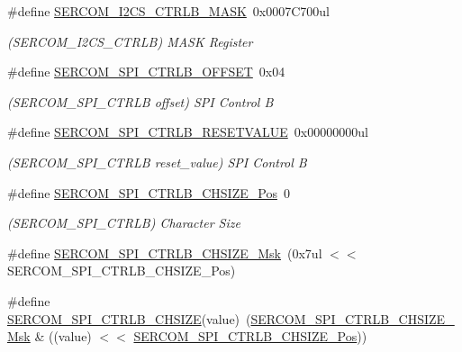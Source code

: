 \begin{DoxyCompactItemize}
\item 
\#define \mbox{\hyperlink{group___s_a_m_d21___s_e_r_c_o_m_ga0ea23da70bd50b06c4128f0c984cbf9f}{S\+E\+R\+C\+O\+M\+\_\+\+I2\+C\+S\+\_\+\+C\+T\+R\+L\+B\+\_\+\+M\+A\+SK}}~0x0007\+C700ul
\begin{DoxyCompactList}\small\item\em (S\+E\+R\+C\+O\+M\+\_\+\+I2\+C\+S\+\_\+\+C\+T\+R\+LB) M\+A\+SK Register \end{DoxyCompactList}\item 
\#define \mbox{\hyperlink{group___s_a_m_d21___s_e_r_c_o_m_ga793c49a07dc02c8237ab63e52fd0304c}{S\+E\+R\+C\+O\+M\+\_\+\+S\+P\+I\+\_\+\+C\+T\+R\+L\+B\+\_\+\+O\+F\+F\+S\+ET}}~0x04
\begin{DoxyCompactList}\small\item\em (S\+E\+R\+C\+O\+M\+\_\+\+S\+P\+I\+\_\+\+C\+T\+R\+LB offset) S\+PI Control B \end{DoxyCompactList}\item 
\#define \mbox{\hyperlink{group___s_a_m_d21___s_e_r_c_o_m_ga9a39beaf6f38afbcadd9478ef2ccad06}{S\+E\+R\+C\+O\+M\+\_\+\+S\+P\+I\+\_\+\+C\+T\+R\+L\+B\+\_\+\+R\+E\+S\+E\+T\+V\+A\+L\+UE}}~0x00000000ul
\begin{DoxyCompactList}\small\item\em (S\+E\+R\+C\+O\+M\+\_\+\+S\+P\+I\+\_\+\+C\+T\+R\+LB reset\+\_\+value) S\+PI Control B \end{DoxyCompactList}\item 
\#define \mbox{\hyperlink{group___s_a_m_d21___s_e_r_c_o_m_gafb3a3447ea56a377ecdc8eba9faa21ab}{S\+E\+R\+C\+O\+M\+\_\+\+S\+P\+I\+\_\+\+C\+T\+R\+L\+B\+\_\+\+C\+H\+S\+I\+Z\+E\+\_\+\+Pos}}~0
\begin{DoxyCompactList}\small\item\em (S\+E\+R\+C\+O\+M\+\_\+\+S\+P\+I\+\_\+\+C\+T\+R\+LB) Character Size \end{DoxyCompactList}\item 
\#define \mbox{\hyperlink{group___s_a_m_d21___s_e_r_c_o_m_ga291c7d819f4a2fbbda0e9a0541b8fdab}{S\+E\+R\+C\+O\+M\+\_\+\+S\+P\+I\+\_\+\+C\+T\+R\+L\+B\+\_\+\+C\+H\+S\+I\+Z\+E\+\_\+\+Msk}}~(0x7ul $<$$<$ S\+E\+R\+C\+O\+M\+\_\+\+S\+P\+I\+\_\+\+C\+T\+R\+L\+B\+\_\+\+C\+H\+S\+I\+Z\+E\+\_\+\+Pos)
\item 
\#define \mbox{\hyperlink{group___s_a_m_d21___s_e_r_c_o_m_ga1883bdcc91edc096fe92d494f5343b27}{S\+E\+R\+C\+O\+M\+\_\+\+S\+P\+I\+\_\+\+C\+T\+R\+L\+B\+\_\+\+C\+H\+S\+I\+ZE}}(value)~(\mbox{\hyperlink{group___s_a_m_d21___s_e_r_c_o_m_ga291c7d819f4a2fbbda0e9a0541b8fdab}{S\+E\+R\+C\+O\+M\+\_\+\+S\+P\+I\+\_\+\+C\+T\+R\+L\+B\+\_\+\+C\+H\+S\+I\+Z\+E\+\_\+\+Msk}} \& ((value) $<$$<$ \mbox{\hyperlink{group___s_a_m_d21___s_e_r_c_o_m_gafb3a3447ea56a377ecdc8eba9faa21ab}{S\+E\+R\+C\+O\+M\+\_\+\+S\+P\+I\+\_\+\+C\+T\+R\+L\+B\+\_\+\+C\+H\+S\+I\+Z\+E\+\_\+\+Pos}}))

\end{DoxyCompactItemize}
